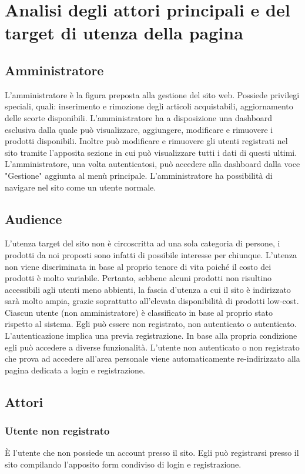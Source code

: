 \section{Analisi degli attori principali e del target di utenza della pagina}

\subsection{Amministratore} L'amministratore è la figura preposta alla gestione del sito web. Possiede privilegi speciali, quali: inserimento e rimozione degli articoli acquistabili, aggiornamento delle scorte disponibili. L'amministratore ha a disposizione una dashboard esclusiva dalla quale può visualizzare, aggiungere, modificare e rimuovere i prodotti disponibili. Inoltre può modificare e rimuovere gli utenti registrati nel sito tramite l'apposita sezione in cui può visualizzare tutti i dati di questi ultimi. L'amministratore, una volta autenticatosi, può accedere alla dashboard dalla voce "Gestione" aggiunta al menù principale. L'amministratore ha possibilità di navigare nel sito come un utente normale.

\subsection{Audience} L'utenza target del sito non è circoscritta ad una sola categoria di persone, i prodotti da noi proposti sono infatti di possibile interesse per chiunque. L'utenza non viene discriminata in base al proprio tenore di vita poiché il costo dei prodotti è molto variabile. Pertanto, sebbene alcuni prodotti non risultino accessibili agli utenti meno abbienti, la fascia d'utenza a cui il sito è indirizzato sarà molto ampia, grazie soprattutto all'elevata disponibilità di prodotti low-cost.
Ciascun utente (non amministratore) è classificato in base al proprio stato rispetto al sistema. Egli può essere non registrato, non autenticato o autenticato. L'autenticazione implica una previa registrazione. In base alla propria condizione egli può accedere a diverse funzionalità. L'utente non autenticato o non registrato che prova ad accedere all'area personale viene automaticamente re-indirizzato alla pagina dedicata a login e registrazione.

\subsection{Attori}
\subsubsection{Utente non registrato} \`E l'utente che non possiede un account presso il sito. Egli può registrarsi presso il sito compilando l'apposito form condiviso di login e registrazione.
